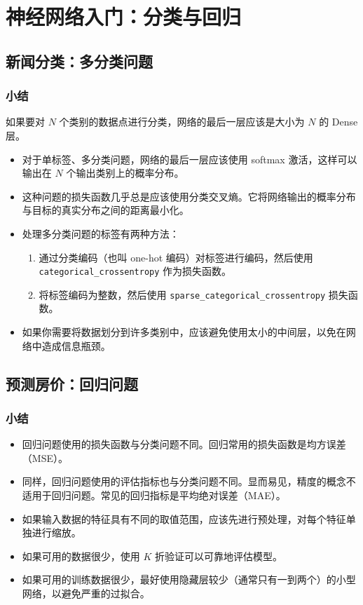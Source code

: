 \chapter{神经网络入门：分类与回归\label{Ch04}}
\section{新闻分类：多分类问题}
\subsection{小结}
如果要对 $N$ 个类别的数据点进行分类，网络的最后一层应该是大小为 $N$ 的 Dense 层。
\begin{itemize}
    \item 对于单标签、多分类问题，网络的最后一层应该使用 softmax 激活，这样可以输出在 $N$ 个输出类别上的概率分布。
    \item  这种问题的损失函数几乎总是应该使用分类交叉熵。它将网络输出的概率分布与目标的真实分布之间的距离最小化。
    \item  处理多分类问题的标签有两种方法：
          \begin{enumerate}
              \item  通过分类编码（也叫 one-hot 编码）对标签进行编码，然后使用 \verb|categorical_crossentropy| 作为损失函数。
              \item  将标签编码为整数，然后使用 \verb|sparse_categorical_crossentropy| 损失函数。
          \end{enumerate}
    \item 如果你需要将数据划分到许多类别中，应该避免使用太小的中间层，以免在网络中造成信息瓶颈。
\end{itemize}

\section{预测房价：回归问题}
\subsection{小结}
\begin{itemize}
    \item 回归问题使用的损失函数与分类问题不同。回归常用的损失函数是均方误差（MSE）。
    \item 同样，回归问题使用的评估指标也与分类问题不同。显而易见，精度的概念不适用于回归问题。常见的回归指标是平均绝对误差（MAE）。
    \item 如果输入数据的特征具有不同的取值范围，应该先进行预处理，对每个特征单独进行缩放。
    \item 如果可用的数据很少，使用 $K$ 折验证可以可靠地评估模型。
    \item 如果可用的训练数据很少，最好使用隐藏层较少（通常只有一到两个）的小型网络，以避免严重的过拟合。
\end{itemize}